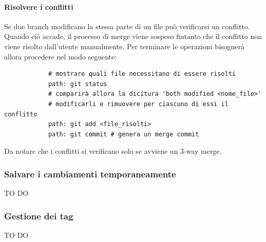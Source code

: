 			\paragraph{Risolvere i conflitti} %
			\label{par:risolvere_i_conflitti}
			Se due branch modificano la stessa parte di un file può verificarsi un conflitto. Quando ciò accade, il processo di merge viene sospeso fintanto che il conflitto non viene risolto dall'utente manualmente. Per terminare le operazioni bisognerà allora procedere nel modo seguente:
			\begin{verbatim}
			# mostrare quali file necessitano di essere risolti
			path: git status
			# comparirà allora la dicitura 'both modified <nome_file>'
			# modificarli e rimuovere per ciascuno di essi il conflitto
			path: git add <file_risolti>
			path: git commit # genera un merge commit
			\end{verbatim}
			Da notare che i conflitti si verificano solo se avviene un 3-way merge.


		\subsubsection{Salvare i cambiamenti temporaneamente} %
		\label{ssub:salvare_i_cambiamenti_temporaneamente}
		TO DO

		\subsubsection{Gestione dei tag} %
		\label{ssub:gestione_dei_tag_locale}
		TO DO


